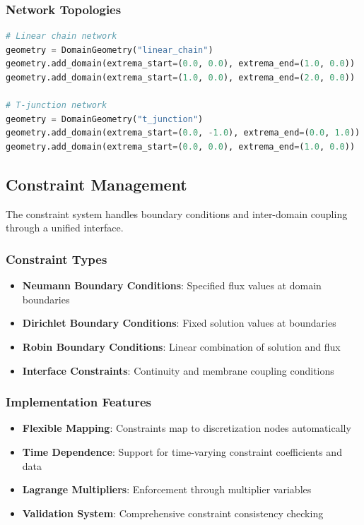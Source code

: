 \subsubsection{Network Topologies}
\begin{lstlisting}[language=Python, caption=Geometry Definition Examples]
# Linear chain network
geometry = DomainGeometry("linear_chain")
geometry.add_domain(extrema_start=(0.0, 0.0), extrema_end=(1.0, 0.0))
geometry.add_domain(extrema_start=(1.0, 0.0), extrema_end=(2.0, 0.0))

# T-junction network
geometry = DomainGeometry("t_junction")
geometry.add_domain(extrema_start=(0.0, -1.0), extrema_end=(0.0, 1.0))
geometry.add_domain(extrema_start=(0.0, 0.0), extrema_end=(1.0, 0.0))
\end{lstlisting}

\subsection{Constraint Management}

The constraint system handles boundary conditions and inter-domain coupling through a unified interface.

\subsubsection{Constraint Types}
\begin{itemize}
    \item \textbf{Neumann Boundary Conditions}: Specified flux values at domain boundaries
    \item \textbf{Dirichlet Boundary Conditions}: Fixed solution values at boundaries
    \item \textbf{Robin Boundary Conditions}: Linear combination of solution and flux
    \item \textbf{Interface Constraints}: Continuity and membrane coupling conditions
\end{itemize}

\subsubsection{Implementation Features}
\begin{itemize}
    \item \textbf{Flexible Mapping}: Constraints map to discretization nodes automatically
    \item \textbf{Time Dependence}: Support for time-varying constraint coefficients and data
    \item \textbf{Lagrange Multipliers}: Enforcement through multiplier variables
    \item \textbf{Validation System}: Comprehensive constraint consistency checking
\end{itemize}

